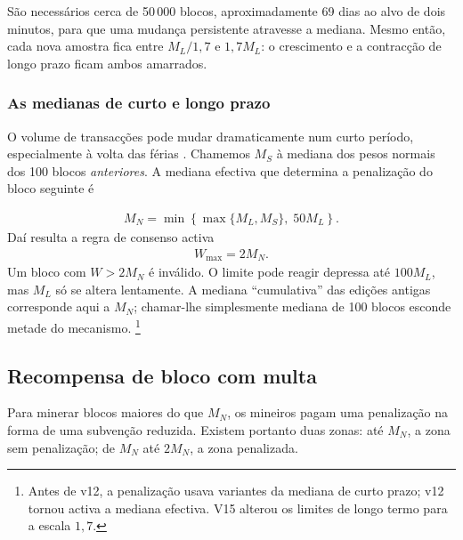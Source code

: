 %
São necessários cerca de 50\,000 blocos, aproximadamente 69 dias ao alvo de
dois minutos, para que uma mudança persistente atravesse a mediana. Mesmo
então, cada nova amostra fica entre $M_L/1{,}7$ e $1{,}7M_L$: o crescimento e a
contracção de longo prazo ficam ambos amarrados.

\subsubsection{As medianas de curto e longo prazo}

%
O volume de transacções pode mudar dramaticamente num curto período,
especialmente à volta das férias \cite{visa-seasonality}. Chamemos $M_S$ à
mediana dos pesos normais dos 100 blocos \emph{anteriores}. A mediana efectiva
que determina a penalização do bloco seguinte é

\begin{align*}
M_N=\min\left\{\max\{M_L,M_S\},\;50M_L\right\}.
\end{align*}
Daí resulta a regra de consenso activa
\begin{align*}
W_{\max}=2M_N.
\end{align*}
Um bloco com $W>2M_N$ é inválido. O limite pode reagir depressa até $100M_L$,
mas $M_L$ só se altera lentamente. A mediana ``cumulativa'' das
edições antigas corresponde aqui a $M_N$; chamar-lhe simplesmente mediana de
100 blocos esconde metade do mecanismo.
\footnote{Antes de v12, a penalização usava variantes da mediana de curto
prazo; v12 tornou activa a mediana efectiva. V15 alterou os limites de longo
termo para a escala $1{,}7$.}
\subsection{Recompensa de bloco com multa}
\label{subsec:penalty}

Para minerar blocos maiores do que $M_N$, os mineiros pagam uma penalização na
forma de uma subvenção reduzida. Existem portanto duas zonas: até $M_N$, a zona
sem penalização; de $M_N$ até $2M_N$, a zona penalizada.


